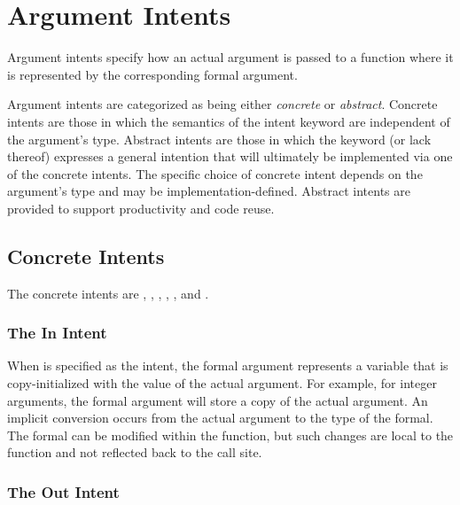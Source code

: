 \section{Argument Intents}
\label{Argument_Intents}

Argument intents specify how an actual argument is passed to a
function where it is represented by the corresponding formal argument.

Argument intents are categorized as being either \emph{concrete}
or \emph{abstract}.  Concrete intents are those in which the semantics
of the intent keyword are independent of the argument's type.
Abstract intents are those in which the keyword (or lack thereof)
expresses a general intention that will ultimately be implemented via
one of the concrete intents.  The specific choice of concrete intent
depends on the argument's type and may be implementation-defined.
Abstract intents are provided to support productivity and code reuse.

\subsection{Concrete Intents}
\label{Concrete Intents}

The concrete intents are , , ,
, , and .

\subsubsection{The In Intent}
\label{The_In_Intent}

When  is specified as the intent, the formal argument
represents a variable that is copy-initialized with the value of the
actual argument. For example, for integer arguments, the formal
argument will store a copy of the actual argument.
An implicit conversion occurs from the actual argument
to the type of the formal.  The
formal can be modified within the function, but such changes are local
to the function and not reflected back to the call site.


\subsubsection{The Out Intent}
\label{The_Out_Intent}

